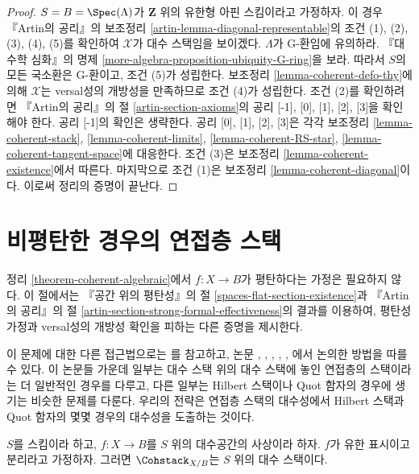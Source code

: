 \begin{proof}
\medskip\noindent
$S = B = \Spec(\Lambda)$가 $\mathbf{Z}$ 위의 유한형 아핀 스킴이라고
가정하자. 이 경우 『Artin의 공리』의 보조정리
\ref{artin-lemma-diagonal-representable}의 조건 (1), (2), (3), (4), (5)를
확인하여 $\mathcal{X}$가 대수 스택임을 보이겠다.
$\Lambda$가 G-환임에 유의하라. 『대수학 심화』의 명제
\ref{more-algebra-proposition-ubiquity-G-ring}을 보라.
따라서 $S$의 모든 국소환은 G-환이고, 조건 (5)가 성립한다.
보조정리 \ref{lemma-coherent-defo-thy}에 의해 $\mathcal{X}$는
versal성의 개방성을 만족하므로 조건 (4)가 성립한다.
조건 (2)를 확인하려면 『Artin의 공리』의 절
\ref{artin-section-axioms}의 공리 [-1], [0], [1], [2], [3]을 확인해야 한다.
공리 [-1]의 확인은 생략한다. 공리 [0], [1], [2], [3]은 각각 보조정리
\ref{lemma-coherent-stack},
\ref{lemma-coherent-limits},
\ref{lemma-coherent-RS-star},
\ref{lemma-coherent-tangent-space}에 대응한다.
조건 (3)은 보조정리 \ref{lemma-coherent-existence}에서 따른다.
마지막으로 조건 (1)은 보조정리 \ref{lemma-coherent-diagonal}이다.
이로써 정리의 증명이 끝난다.
\end{proof}








\section{비평탄한 경우의 연접층 스택}
\label{section-not-flat}

\noindent
정리 \ref{theorem-coherent-algebraic}에서 $f : X \to B$가 평탄하다는
가정은 필요하지 않다. 이 절에서는 『공간 위의 평탄성』의 절
\ref{spaces-flat-section-existence}과 『Artin의 공리』의 절
\ref{artin-section-strong-formal-effectiveness}의 결과를 이용하여,
평탄성 가정과 versal성의 개방성 확인을 피하는 다른 증명을 제시한다.

\medskip\noindent
이 문제에 대한 다른 접근법으로는 \cite{ArtinI}를 참고하고, 논문
\cite{olsson-starr}, \cite{lieblich_remarks}, \cite{olsson_proper},
\cite{Hall-Rydh}, \cite{Hall-Rydh-Hilbert}, \cite{rydh_representability}에서
논의한 방법을 따를 수 있다. 이 논문들 가운데 일부는 대수 스택 위의
대수 스택에 놓인 연접층의 스택이라는 더 일반적인 경우를 다루고,
다른 일부는 Hilbert 스택이나 Quot 함자의 경우에 생기는 비슷한 문제를
다룬다. 우리의 전략은 연접층 스택의 대수성에서 Hilbert 스택과 Quot 함자의
몇몇 경우의 대수성을 도출하는 것이다.

\begin{theorem}
\label{theorem-coherent-algebraic-general}
$S$를 스킴이라 하고, $f : X \to B$를 $S$ 위의 대수공간의 사상이라 하자.
$f$가 유한 표시이고 분리라고 가정하자. 그러면
$\Cohstack_{X/B}$는 $S$ 위의 대수 스택이다.
\end{theorem}

